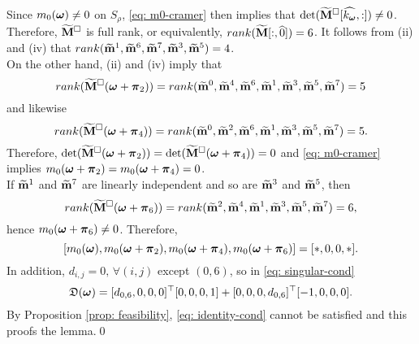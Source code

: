 Since $m_0(\V{\omega})\neq 0$ on $S_\rho$, \eqref{eq: m0-cramer} then implies that $\det(\Msub[\widehat{k_{\V{\omega}}},:])\neq 0$. Therefore, $\Msub$ is full rank, or equivalently, $rank(\M[:,\widehat{0}]) = 6$. It follows from  (ii) and (iv) that $rank(\mrow{1},\mrow{6},\mrow{7},\mrow{3},\mrow{5})= 4$.\\
On the other hand, (ii) and (iv) imply that $$rank(\Msub(\V{\omega}+\V{\pi}_2))=rank(\mrow{0},\mrow{4},\mrow{6},\mrow{1},\mrow{3},\mrow{5},\mrow{7})= 5$$ and likewise $$rank(\Msub(\V{\omega}+\V{\pi}_4))=rank(\mrow{0},\mrow{2},\mrow{6},\mrow{1},\mrow{3},\mrow{5},\mrow{7})= 5.$$ Therefore, $\det(\Msub(\V{\omega} + \V{\pi}_2)) = \det(\Msub(\V{\omega} + \V{\pi}_4)) = 0$ and \eqref{eq: m0-cramer} implies $m_0(\V{\omega}+\V{\pi}_2) = m_0(\V{\omega}+\V{\pi}_4) = 0$.\\
If $\mrow{1}$ and $\mrow{7}$ are linearly independent and so are $\mrow{3}$ and $\mrow{5}$, then $$rank(\Msub(\V{\omega}+\V{\pi}_6))=rank(\mrow{2},\mrow{4},\mrow{1},\mrow{3},\mrow{5},\mrow{7}) = 6,$$ hence $m_0(\V{\omega}+\V{\pi}_6)\neq 0$. Therefore, $$[m_0(\V{\omega}),m_0(\V{\omega}+\V{\pi}_2),m_0(\V{\omega}+\V{\pi}_4),m_0(\V{\omega}+\V{\pi}_6)] = [*,0,0,*].$$ In addition, $d_{i,j} = 0,\, \forall(i,j)$ except $(0,6)$, so in \eqref{eq: singular-cond} $$\mathfrak{D}(\V{\omega}) = [d_{0,6}, 0, 0,0]^\top [0,0,0,1] + [0,0,0,d_{0,6}]^\top [-1,0,0,0].$$  By Proposition \ref{prop: feasibility}, \eqref{eq: identity-cond} cannot be satisfied and this proofs the lemma.\qed

